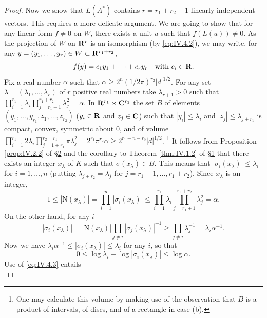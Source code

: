 \begin{proof}
Now we show that $L(A^{*})$ contains $r=r_{1}+r_{2}-1$ linearly independent
vectors. This requires a more delicate argument. We are going to show that
for any linear form $f\neq0$ on $W$, there exists a unit $u$ such that
$f(L(u))\neq0$. As the projection of $W$ on $\mathbf{R}^{r}$ is an isomorphism (by
\eqref{eq:IV.4.2}), we may write, for any
$y=(y_{1},\ldots,y_{r})\in W\subset\mathbf{R}^{r_{1}+r_{2}}$,
\begin{equation}
f(y)=c_{1}y_{1}+\cdots+c_{r}y_{r}\quad\text{with }c_{i}\in\mathbf{R}.
\label{eq:IV.4.3}
\end{equation}
Fix a real number $\alpha$ such that
$\alpha\geq2^{n}(1/2\pi)^{r_{2}}|d|^{1/2}$. For any set
$\lambda=(\lambda_{1},\ldots,\lambda_{r})$ of $r$ positive real numbers take
$\lambda_{r+1}>0$ such that
$\prod_{i=1}^{r_{1}}\lambda_{i}
\prod_{j=r_{1}+1}^{r_{1}+r_{2}}\lambda_{j}^{2}=\alpha$. In
$\mathbf{R}^{r_{1}}\times\mathbf{C}^{r_{2}}$ the set $B$ of elements
$(y_{1},\ldots,y_{r_{1}},z_{1},\ldots,z_{r_{2}})$ ($y_{i}\in\mathbf{R}$ and
$z_{j}\in\mathbf{C}$) such that $|y_{i}|\leq\lambda_{i}$ and
$|z_{j}|\leq\lambda_{j+r_{1}}$ is compact, convex, symmetric about $0$, and
of volume
$\prod_{i=1}^{r_{1}}2\lambda_{i}
\prod_{j=1+r_{1}}^{r_{2}+r_{1}}\pi\lambda_{j}^{2}
=2^{r_{1}}\pi^{r_{2}}\alpha\geq2^{r_{1}+n-r_{2}}|d|^{1/2}$.
\footnote{One may calculate this volume by making use of the observation
that $B$ is a product of intervals, of discs, and of a rectangle in case
(b).} It follows
from Proposition \ref{prop:IV.2.2} of \hyperref[sec:4.2]{§2} and the corollary to Theorem
\ref{thm:IV.1.2} of \hyperref[sec:4.1]{§1} that there exists an integer $x_{\lambda}$ of $K$
such that $\sigma(x_{\lambda})\in B$. This means that
$|\sigma_{i}(x_{\lambda})|\leq\lambda_{i}$ for $i=1,\ldots,n$ (putting
$\lambda_{j+r_{2}}=\lambda_{j}$ for $j=r_{1}+1,\ldots,r_{1}+r_{2}$). Since
$x_{\lambda}$ is an integer,
\[
1\leq|\mathrm{N}(x_{\lambda})|=\prod_{i=1}^{n}|\sigma_{i}(x_{\lambda})|
\leq\prod_{i=1}^{r_{1}}\lambda_{i}
\prod_{j=r_{1}+1}^{r_{1}+r_{2}}\lambda_{j}^{2}=\alpha.
\]
On the other hand, for any $i$
\[
|\sigma_{i}(x_{\lambda})|=|\mathrm{N}(x_{\lambda})|
\prod_{j\neq i}|\sigma_{j}(x_{\lambda})|^{-1}
\geq\prod_{j\neq i}\lambda_{j}^{-1}=\lambda_{i}\alpha^{-1}.
\]
Now we have $\lambda_{i}\alpha^{-1}\leq|\sigma_{i}(x_{\lambda})|\leq
\lambda_{i}$ for any $i$, so that
\begin{equation}
0\leq\log\lambda_{i}-\log|\sigma_{i}(x_{\lambda})|\leq\log\alpha.
\label{eq:IV.4.4}
\end{equation}
Use of \eqref{eq:IV.4.3} entails
\begin{equation}

\end{equation}
\end{proof}
